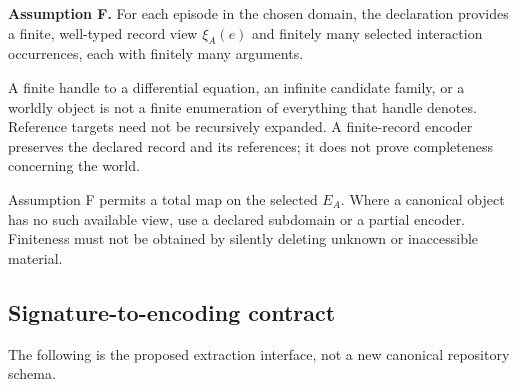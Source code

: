 \documentclass[11pt,a4paper]{article}
\begin{document}
\textbf{Assumption F.} For each episode in the chosen domain, the
declaration provides a finite, well-typed record view \(\xi_A(e)\) and
finitely many selected interaction occurrences, each with finitely many
arguments.

A finite handle to a differential equation, an infinite candidate
family, or a worldly object is not a finite enumeration of everything
that handle denotes. Reference targets need not be recursively expanded.
A finite-record encoder preserves the declared record and its
references; it does not prove completeness concerning the world.

Assumption F permits a total map on the selected \(E_A\). Where a
canonical object has no such available view, use a declared subdomain or
a partial encoder. Finiteness must not be obtained by silently deleting
unknown or inaccessible material.

\subsection{Signature-to-encoding
contract}\label{signature-to-encoding-contract}

The following is the proposed extraction interface, not a new canonical
repository schema.
\end{document}
